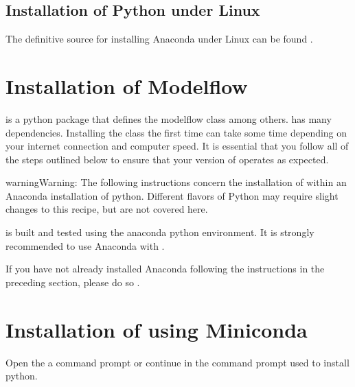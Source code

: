 \documentclass[letterpaper,10pt,english]{jupyterBook}
\begin{document}
\subsection{Installation of Python under Linux}
\label{\detokenize{content/03_Installation/Installing:installation-of-python-under-linux}}
\sphinxAtStartPar
The definitive source for installing Anaconda under Linux can be found .


\section{Installation of Modelflow}
\label{\detokenize{content/03_Installation/Installing:installation-of-modelflow}}
\sphinxAtStartPar
{} is a python package that defines the modelflow class  among others.   has many dependencies. Installing the class the first time can take some time depending on your internet connection and computer speed.  It is essential that you follow all of the steps outlined below to ensure that your version of  operates as expected.

\begin{sphinxadmonition}{warning}{Warning:}
\sphinxAtStartPar
The following instructions concern the installation of  within an Anaconda installation of python.  Different flavors of Python may require slight changes to this recipe, but are not covered here.

\sphinxAtStartPar
{} is built and tested using the anaconda python environment.  It is strongly recommended to use Anaconda with .

\sphinxAtStartPar
If you have not already installed Anaconda following the instructions in the preceding section, please do so .
\end{sphinxadmonition}


\section{Installation of  using Miniconda}
\label{\detokenize{content/03_Installation/Installing:installation-of-modelflow-using-miniconda}}
\sphinxAtStartPar
Open the a command prompt or continue in the command prompt used to install python.
\end{document}
